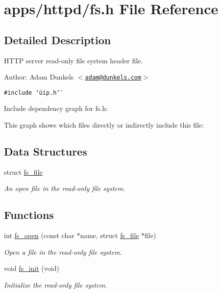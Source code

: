 \hypertarget{a00036}{
\section{apps/httpd/fs.h File Reference}
\label{a00036}
}


\subsection{Detailed Description}
HTTP server read-only file system header file. 

\begin{Desc}
\item[Author:]Adam Dunkels $<$\href{mailto:adam@dunkels.com}{\tt adam@dunkels.com}$>$ \end{Desc}


{\tt \#include \char`\"{}uip.h\char`\"{}}\par


Include dependency graph for fs.h:

This graph shows which files directly or indirectly include this file:\subsection*{Data Structures}
\begin{CompactItemize}
\item 
struct \hyperlink{a00026}{fs\_\-file}
\begin{CompactList}\small\item\em An open file in the read-only file system. \item\end{CompactList}\end{CompactItemize}
\subsection*{Functions}
\begin{CompactItemize}
\item 
int \hyperlink{a00082_g31dac76e56ce334835427efcfb58e2bd}{fs\_\-open} (const char $\ast$name, struct \hyperlink{a00026}{fs\_\-file} $\ast$file)
\begin{CompactList}\small\item\em Open a file in the read-only file system. \item\end{CompactList}\item 
\hypertarget{a00082_ge9386973b39dad27b36dc6262ec4d6b9}{
void \hyperlink{a00082_ge9386973b39dad27b36dc6262ec4d6b9}{fs\_\-init} (void)}
\label{a00082_ge9386973b39dad27b36dc6262ec4d6b9}

\begin{CompactList}\small\item\em Initialize the read-only file system. \item\end{CompactList}\end{CompactItemize}
